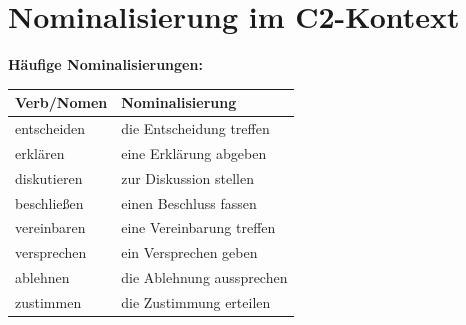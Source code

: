 \section{Nominalisierung im C2-Kontext}
\label{sec:C2Nominalisierung}

\bigskip
\noindent\textbf{Häufige Nominalisierungen:}

\begin{center}
\begin{tabular}{|l|l|}
\hline
Verb/Nomen & Nominalisierung \\ \hline
entscheiden & die Entscheidung treffen \\ \hline
erklären & eine Erklärung abgeben \\ \hline
diskutieren & zur Diskussion stellen \\ \hline
beschließen & einen Beschluss fassen \\ \hline
vereinbaren & eine Vereinbarung treffen \\ \hline
versprechen & ein Versprechen geben \\ \hline
ablehnen & die Ablehnung aussprechen \\ \hline
zustimmen & die Zustimmung erteilen \\ \hline
\end{tabular}
\end{center}

\chapterend